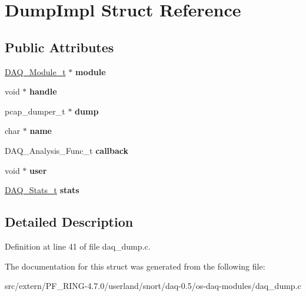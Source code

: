 \hypertarget{struct_dump_impl}{
\section{DumpImpl Struct Reference}
\label{struct_dump_impl}
}
\subsection*{Public Attributes}
\begin{DoxyCompactItemize}
\item 
\hypertarget{struct_dump_impl_ab52c82735ee32c40383dde3f820b6be7}{
\hyperlink{struct__daq__module}{DAQ\_\-Module\_\-t} $\ast$ {\bfseries module}}
\label{struct_dump_impl_ab52c82735ee32c40383dde3f820b6be7}

\item 
\hypertarget{struct_dump_impl_a33e346c09009389d0325cca59b600ea8}{
void $\ast$ {\bfseries handle}}
\label{struct_dump_impl_a33e346c09009389d0325cca59b600ea8}

\item 
\hypertarget{struct_dump_impl_a34877842afd24040e4bda754012ad2eb}{
pcap\_\-dumper\_\-t $\ast$ {\bfseries dump}}
\label{struct_dump_impl_a34877842afd24040e4bda754012ad2eb}

\item 
\hypertarget{struct_dump_impl_a2c170d9280ef08ce6d81bb474d5558da}{
char $\ast$ {\bfseries name}}
\label{struct_dump_impl_a2c170d9280ef08ce6d81bb474d5558da}

\item 
\hypertarget{struct_dump_impl_af14426a98b07da42c5d81072acc84870}{
DAQ\_\-Analysis\_\-Func\_\-t {\bfseries callback}}
\label{struct_dump_impl_af14426a98b07da42c5d81072acc84870}

\item 
\hypertarget{struct_dump_impl_a618b66dfc1dd9fb04fdf46090dad635b}{
void $\ast$ {\bfseries user}}
\label{struct_dump_impl_a618b66dfc1dd9fb04fdf46090dad635b}

\item 
\hypertarget{struct_dump_impl_a9f6e4c3878d7cf9ac32b0a2fc53f43ac}{
\hyperlink{struct__daq__stats}{DAQ\_\-Stats\_\-t} {\bfseries stats}}
\label{struct_dump_impl_a9f6e4c3878d7cf9ac32b0a2fc53f43ac}

\end{DoxyCompactItemize}


\subsection{Detailed Description}


Definition at line 41 of file daq\_\-dump.c.



The documentation for this struct was generated from the following file:\begin{DoxyCompactItemize}
\item 
src/extern/PF\_\-RING-\/4.7.0/userland/snort/daq-\/0.5/os-\/daq-\/modules/daq\_\-dump.c\end{DoxyCompactItemize}
